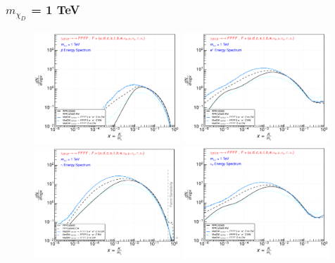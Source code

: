 \documentclass[epj,nopacs,fleqn]{svjour}
\begin{document}
\subsubsection{ $m_{\chi_D}$ = 1 TeV}
\begin{figure}[!b]
\centering
\subfigure
{ \includegraphics[width=0.49\textwidth]{Fig/xdxd_FFFF_WZ/1_antiprotons_FFFF_1.pdf}}
\subfigure
{ \includegraphics[width=0.49\textwidth]{Fig/xdxd_FFFF_WZ/1_positrons_FFFF_1.pdf}}
\subfigure
{ \includegraphics[width=0.49\textwidth]{Fig/xdxd_FFFF_WZ/1_gammas_FFFF_1.pdf}}
\subfigure
{ \includegraphics[width=0.49\textwidth]{Fig/xdxd_FFFF_WZ/1_neutrinos_e_FFFF_1.pdf}}

\end{figure}
\end{document}
